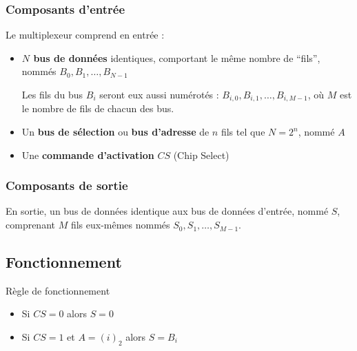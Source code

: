 \documentclass[a4paper,12pt]{article}
\begin{document}
\subsubsection{Composants d'entrée}

Le multiplexeur comprend en entrée :
\begin{itemize}
    \item \textbf{$N$ bus de données} identiques, comportant le même nombre de ``fils'', nommés $B_0, B_1, \ldots, B_{N-1}$
    
    Les fils du bus $B_i$ seront eux aussi numérotés : $B_{i,0}, B_{i,1}, \ldots, B_{i,M-1}$, où $M$ est le nombre de fils de chacun des bus.
    
    \item Un \textbf{bus de sélection} ou \textbf{bus d'adresse} de $n$ fils tel que $N = 2^n$, nommé $A$
    
    \item Une \textbf{commande d'activation} $CS$ (Chip Select)
\end{itemize}

\subsubsection{Composants de sortie}

En sortie, un bus de données identique aux bus de données d'entrée, nommé $S$, comprenant $M$ fils eux-mêmes nommés $S_0, S_1, \ldots, S_{M-1}$.

\subsection{Fonctionnement}

\begin{propbox}{Règle de fonctionnement}
\begin{itemize}
    \item Si $CS = 0$ alors $S = 0$
    \item Si $CS = 1$ et $A = (i)_2$ alors $S = B_i$
\end{itemize}
\end{propbox}

\begin{center}
\end{center}
\end{document}
